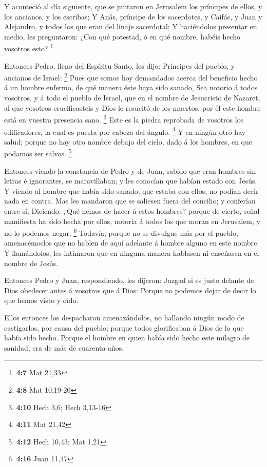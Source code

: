  Y aconteció al día siguiente, que se juntaron en
Jerusalem los príncipes de ellos, y los ancianos, y los escribas;
 Y Anás, príncipe de los sacerdotes, y Caifás, y Juan y
Alejandro, y todos los que eran del linaje sacerdotal;  Y
haciéndolos presentar en medio, les preguntaron: ¿Con qué potestad, ó en
qué nombre, habéis hecho vosotros esto? \footnote{\textbf{4:7} Mat 21,33}

 Entonces Pedro, lleno del Espíritu Santo, les dijo:
Príncipes del pueblo, y ancianos de Israel: \footnote{\textbf{4:8} Mat
  10,19-20}  Pues que somos hoy demandados acerca del
beneficio hecho á un hombre enfermo, de qué manera éste haya sido
sanado,  Sea notorio á todos vosotros, y á todo el pueblo
de Israel, que en el nombre de Jesucristo de Nazaret, al que vosotros
crucificasteis y Dios le resucitó de los muertos, por él este hombre
está en vuestra presencia sano. \footnote{\textbf{4:10} Hech 3,6; Hech
  3,13-16}  Este es la piedra reprobada de vosotros los
edificadores, la cual es puesta por cabeza del ángulo. \footnote{\textbf{4:11}
  Mat 21,42}  Y en ningún otro hay salud; porque no hay
otro nombre debajo del cielo, dado á los hombres, en que podamos ser
salvos. \footnote{\textbf{4:12} Hech 10,43; Mat 1,21}

 Entonces viendo la constancia de Pedro y de Juan, sabido
que eran hombres sin letras é ignorantes, se maravillaban; y les
conocían que habían estado con Jesús.  Y viendo al hombre
que había sido sanado, que estaba con ellos, no podían decir nada en
contra.  Mas les mandaron que se saliesen fuera del
concilio; y conferían entre sí,  Diciendo: ¿Qué hemos de
hacer á estos hombres? porque de cierto, señal manifiesta ha sido hecha
por ellos, notoria á todos los que moran en Jerusalem, y no lo podemos
negar. \footnote{\textbf{4:16} Juan 11,47}  Todavía,
porque no se divulgue más por el pueblo, amenacémoslos que no hablen de
aquí adelante á hombre alguno en este nombre.  Y
llamándolos, les intimaron que en ninguna manera hablasen ni enseñasen
en el nombre de Jesús.

 Entonces Pedro y Juan, respondiendo, les dijeron: Juzgad
si es justo delante de Dios obedecer antes á vosotros que á Dios:
 Porque no podemos dejar de decir lo que hemos visto y
oído.

 Ellos entonces los despacharon amenazándolos, no
hallando ningún modo de castigarlos, por causa del pueblo; porque todos
glorificaban á Dios de lo que había sido hecho.  Porque
el hombre en quien había sido hecho este milagro de sanidad, era de más
de cuarenta años.

